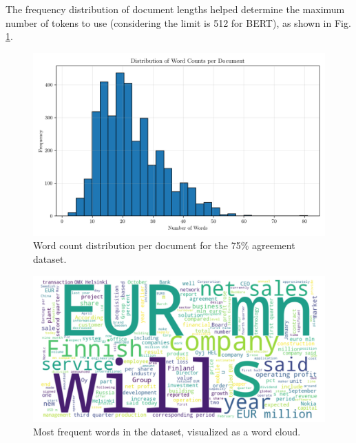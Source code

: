 \documentclass[conference]{IEEEtran}
\begin{document}
The frequency distribution of document lengths helped determine the maximum number of tokens to use (considering the limit is 512 for BERT), as shown in Fig. \ref{fig:word_count_distribution}.

\begin{figure}[H]
    \centering
    \includegraphics[width=1\linewidth]{assets/word_count_distribution.png}
    \caption{Word count distribution per document for the 75\% agreement dataset.}
    \label{fig:word_count_distribution}
\end{figure}

\begin{figure}[H]
    \centering
    \includegraphics[width=1\linewidth]{assets/word_cloud_75agree.png}
    \caption{Most frequent words in the dataset, visualized as a word cloud.}
    \label{fig:word_cloud_75agree}
\end{figure}


\end{document}
